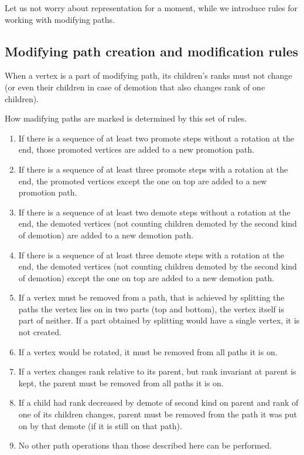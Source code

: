 Let us not worry about representation for a moment, while we introduce rules for working with modifying paths.

\subsection{Modifying path creation and modification rules}

When a vertex is a part of modifying path, its children's ranks must not change (or even their children in case of demotion that also changes rank of one children). 

How madifying paths are marked is determined by this set of rules.

\begin{enumerate}

\item If there is a sequence of at least two promote steps without a rotation at the end, those promoted vertices are added to a new promotion path. 

\item If there is a sequence of at least three promote steps with a rotation at the end, the promoted vertices except the one on top are added to a new promotion path.

\item If there is a sequence of at least two demote steps without a rotation at the end, the demoted vertices (not counting children demoted by the second kind of demotion) are added to a new demotion path.

\item If there is a sequence of at least three demote steps with a rotation at the end, the demoted vertices (not counting children demoted by the second kind of demotion) except the one on top are added to a new demotion path.

\item If a vertex must be removed from a path, that is achieved by splitting the paths the vertex lies on in two parts (top and bottom), the vertex itself is part of neither. If a part obtained by splitting would have a single vertex, it is not created.

\item If a vertex would be rotated, it must be removed from all paths it is on.

\item If a vertex changes rank relative to its parent, but rank invariant at parent is kept, the parent must be removed from all paths it is on.

\item If a child had rank decreased by demote of second kind on parent and rank of one of its children changes, parent must be removed from the path it was put on by that demote (if it is still on that path).

\item No other path operations than those described here can be performed.

\end{enumerate}

